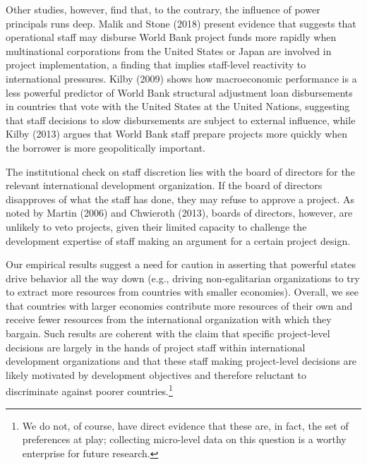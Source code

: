 \documentclass{article}
\begin{document}
Other studies, however, find that, to the contrary, the influence of power principals runs deep.  Malik and Stone (2018) present evidence that suggests that operational staff may disburse World Bank project funds more rapidly when multinational corporations from the United States or Japan are involved in project implementation, a finding that implies staff-level reactivity to international pressures.  Kilby (2009) shows how macroeconomic performance is a less powerful predictor of World Bank structural adjustment loan disbursements in countries that vote with the United States at the United Nations, suggesting that staff decisions to slow disbursements are subject to external influence, while Kilby (2013) argues that World Bank staff prepare projects more quickly when the borrower is more geopolitically important.

The institutional check on staff discretion lies with the board of directors for the relevant international development organization.  If the board of directors disapproves of what the staff has done, they may refuse to approve a project.  As noted by Martin (2006) and Chwieroth (2013), boards of directors, however, are unlikely to veto projects, given their limited capacity to challenge the development expertise of staff making an argument for a certain project design.

Our empirical results suggest a need for caution in asserting that powerful states drive behavior all the way down (e.g., driving non-egalitarian organizations to try to extract more resources from countries with smaller economies). Overall, we see that countries with larger economies contribute more resources of their own and receive fewer resources from the international organization with which they bargain.  Such results are coherent with the claim that specific project-level decisions are largely in the hands of project staff within international development organizations and that these staff making project-level decisions are likely motivated by development objectives and therefore reluctant to discriminate against poorer countries.\footnote{We do not, of course, have direct evidence that these are, in fact, the set of preferences at play; collecting micro-level data on this question is a worthy enterprise for future research.}   
\end{document}
